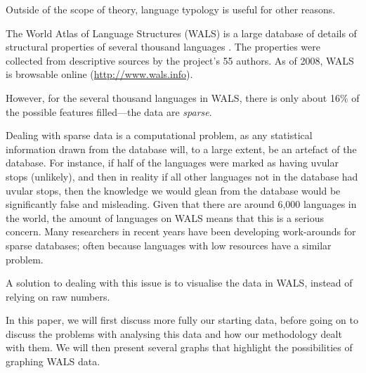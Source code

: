 \documentclass[11pt]{article}
\begin{document}
Outside of the scope of theory, language typology is useful for other reasons. %

The World Atlas of Language Structures (WALS) is a large database of details of structural properties of several thousand languages \cite{wals-2011}. The properties were collected from descriptive sources by the project's 55 authors. As of 2008, WALS is browsable online (\url{http://www.wals.info}).

However, for the several thousand languages in WALS, there is only about 16\% of the possible features filled---the data are \emph{sparse}.

Dealing with sparse data is a computational problem, as any statistical information drawn from the database will, to a large extent, be an artefact of the database. For instance, if half of the languages were marked as having uvular stops (unlikely), and then in reality if all other languages not in the database had uvular stops, then the knowledge we would glean from the database would be significantly false and misleading. Given that there are around 6,000 languages in the world, the amount of languages on WALS means that this is a serious concern. Many researchers in recent years have been developing work-arounds for sparse databases; often because languages with low resources have a similar problem. %


A solution to dealing with this issue is to visualise the data in WALS, instead of relying on raw numbers.



In this paper, we will first discuss more fully our starting data, before going on to discuss the problems with analysing this data and how our methodology dealt with them. We will then present several graphs that highlight the possibilities of graphing WALS data. 
\end{document}
